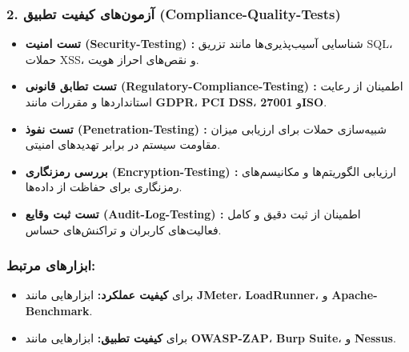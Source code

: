 \subsubsection*{2. آزمون‌های کیفیت تطبیق (Compliance-Quality-Tests)}
\begin{itemize}
	\item \textbf{تست امنیت (Security-Testing) :} شناسایی آسیب‌پذیری‌ها مانند تزریق SQL، حملات XSS، و نقص‌های احراز هویت.
	\item \textbf{تست تطابق قانونی (Regulatory-Compliance-Testing) :} اطمینان از رعایت استانداردها و مقررات مانند \textbf{GDPR}، \textbf{PCI DSS}، و \textbf{27001ISO}.
	\item \textbf{تست نفوذ (Penetration-Testing) :} شبیه‌سازی حملات برای ارزیابی میزان مقاومت سیستم در برابر تهدیدهای امنیتی.
	\item \textbf{بررسی رمزنگاری (Encryption-Testing) :} ارزیابی الگوریتم‌ها و مکانیسم‌های رمزنگاری برای حفاظت از داده‌ها.
	\item \textbf{تست ثبت وقایع (Audit-Log-Testing) :} اطمینان از ثبت دقیق و کامل فعالیت‌های کاربران و تراکنش‌های حساس.
\end{itemize}

\subsubsection*{ابزارهای مرتبط:}
\begin{itemize}
	\item برای \textbf{کیفیت عملکرد:} ابزارهایی مانند \textbf{JMeter}، \textbf{LoadRunner}، و \textbf{Apache-Benchmark}.
	\item برای \textbf{کیفیت تطبیق:} ابزارهایی مانند \textbf{OWASP-ZAP}، \textbf{Burp Suite}، و \textbf{Nessus}.
\end{itemize}

\pagebreak


